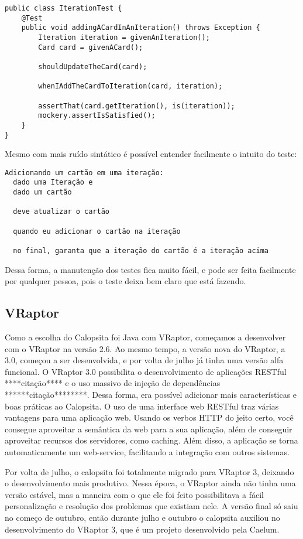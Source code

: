 \begin{lstlisting}
public class IterationTest {
	@Test
	public void addingACardInAnIteration() throws Exception {
		Iteration iteration = givenAnIteration();
		Card card = givenACard();

		shouldUpdateTheCard(card);

		whenIAddTheCardToIteration(card, iteration);

		assertThat(card.getIteration(), is(iteration));
		mockery.assertIsSatisfied();
	}
}
\end{lstlisting}

Mesmo com mais ruído sintático é possível entender facilmente o intuito do teste:

\begin{verbatim}
Adicionando um cartão em uma iteração:
  dado uma Iteração e
  dado um cartão
  
  deve atualizar o cartão
  
  quando eu adicionar o cartão na iteração
  
  no final, garanta que a iteração do cartão é a iteração acima
\end{verbatim}

Dessa forma, a manutenção dos testes fica muito fácil, e pode ser feita facilmente por qualquer pessoa, pois o teste deixa bem claro que está fazendo.


\subsection{VRaptor}

Como a escolha do Calopsita foi Java com VRaptor, começamos a desenvolver com o VRaptor na versão 2.6. 
Ao mesmo tempo, a versão nova do VRaptor, a 3.0, começou a ser desenvolvida, e por volta de julho já tinha 
uma versão alfa funcional. O VRaptor 3.0 possibilita o desenvolvimento de aplicações RESTful ****citação**** 
e o uso massivo de injeção de dependências ******citação********. Dessa forma, era possível adicionar mais 
características e boas práticas ao Calopsita. O uso de uma interface web RESTful traz várias vantagens para 
uma aplicação web. Usando os verbos HTTP do jeito certo, você consegue aproveitar a semântica da web para a 
sua aplicação, além de conseguir aproveitar recursos dos servidores, como caching. Além disso, a aplicação 
se torna automaticamente um web-service, facilitando a integração com outros sistemas.

Por volta de julho, o calopsita foi totalmente migrado para VRaptor 3, deixando o desenvolvimento mais produtivo. 
Nessa época, o VRaptor ainda não tinha uma versão estável, mas a maneira com o que ele foi feito possibilitava a fácil
personalização e resolução dos problemas que existiam nele. A versão final só saiu no começo de outubro, então durante 
julho e outubro o calopsita auxiliou no desenvolvimento do VRaptor 3, que é um projeto \opensource desenvolvido pela Caelum.

